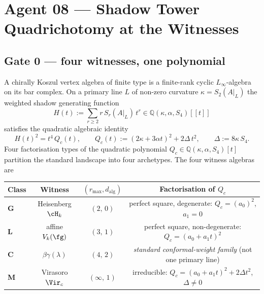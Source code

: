 
\section*{Agent 08 --- Shadow Tower Quadrichotomy at the Witnesses}

\subsection*{Gate 0 --- four witnesses, one polynomial}

A chirally Koszul vertex algebra of finite type is a finite-rank
cyclic $L_\infty$-algebra on its bar complex. On a primary line $L$
of non-zero curvature $\kappa = S_2(A|_L)$ the weighted shadow
generating function
\[
  H(t) := \sum_{r\ge 2} r\,S_r(A|_L)\,t^r
        \in \mathbb Q(\kappa,\alpha,S_4)[[t]]
\]
satisfies the quadratic algebraic identity
\[
  H(t)^2 = t^4\,Q_c(t),
  \qquad
  Q_c(t) := (2\kappa + 3\alpha t)^2 + 2\Delta\,t^2,
  \qquad
  \Delta := 8\kappa\,S_4.
\]
Four factorisation types of the quadratic polynomial $Q_c \in
\mathbb Q(\kappa,\alpha,S_4)[t]$ partition the standard landscape into
four archetypes. The four witness algebras are
\begin{center}
\begin{tabular}{l|c|c|c}
\textbf{Class} & \textbf{Witness} & $(r_{\max}, d_{\mathrm{alg}})$
 & Factorisation of $Q_c$ \\
\hline
\textbf{G} & Heisenberg $\cH_k$ & $(2,\,0)$
  & perfect square, degenerate: $Q_c = (a_0)^2$, $a_1 = 0$ \\
\textbf{L} & affine $V_k(\fg)$ & $(3,\,1)$
  & perfect square, non-degenerate: $Q_c = (a_0 + a_1 t)^2$ \\
\textbf{C} & $\beta\gamma(\lambda)$ & $(4,\,2)$
  & \emph{standard conformal-weight family} (not one primary line) \\
\textbf{M} & Virasoro $\Vir_c$ & $(\infty,\,1)$
  & irreducible: $Q_c = (a_0 + a_1 t)^2 + 2\Delta t^2$, $\Delta \ne 0$ \\
\end{tabular}
\end{center}

